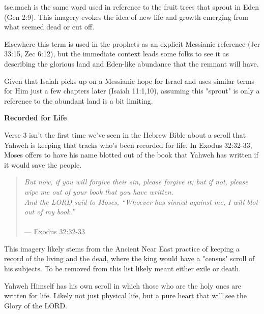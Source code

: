 \documentclass[11pt]{article}
\begin{document}

tse.mach is the same word used in reference to the fruit trees that sprout in Eden (Gen 2:9). This imagery evokes the idea of new life and growth emerging from what seemed dead or cut off.
\vspace{1em}

Elsewhere this term is used in the prophets as an explicit Messianic reference (Jer 33:15, Zec 6:12), but the immediate context leads some folks to see it as describing the glorious land and Eden-like abundance that the remnant will have.
\vspace{1em}

Given that Isaiah picks up on a Messianic hope for Israel and uses similar terms for Him just a few chapters later (Isaiah 11:1,10), assuming this "sprout" is only a reference to the abundant land is a bit limiting.


\vspace{3em}
{\large\bfseries Recorded for Life}
\vspace{1em}

Verse 3 isn't the first time we've seen in the Hebrew Bible about a scroll that Yahweh is keeping that tracks who's been recorded for life.
In Exodus 32:32-33, Moses offers to have his name blotted out of the book that Yahweh has written if it would save the people.

\begin{quote}
\textit{But now, if you will forgive their sin, please forgive it; but if not, please wipe me out of your book that you have written.
\\And the LORD said to Moses, “Whoever has sinned against me, I will blot out of my book.”}\\\\
\hfill --- Exodus 32:32-33
\end{quote}

{\vspace{1em}}

This imagery likely stems from the Ancient Near East practice of keeping a record of the living and the dead, where the king would have a "census" scroll of his subjects. To be removed from this list likely meant either exile or death.

{\vspace{1em}}

Yahweh Himself has his own scroll in which those who are the holy ones are written for life. Likely not just physical life, but a pure heart that will see the Glory of the LORD.
\end{document}
